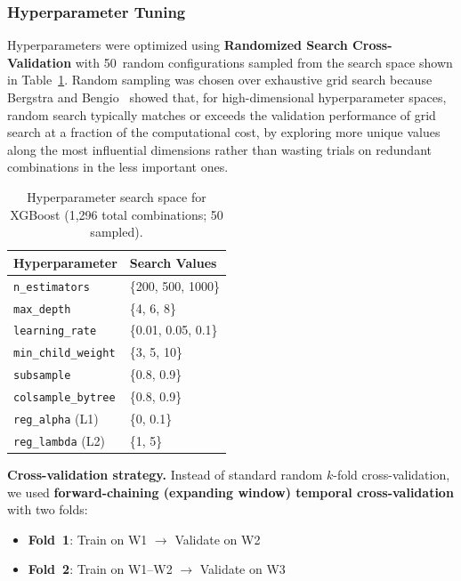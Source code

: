 \subsubsection{Hyperparameter Tuning}
\label{subsubsec:hyperparameter_tuning}

Hyperparameters were optimized using \textbf{Randomized Search Cross-Validation} with 50~random configurations sampled from the search space shown in Table~\ref{tab:hyperparam_search}. Random sampling was chosen over exhaustive grid search because Bergstra and Bengio~\cite{bergstra2012random} showed that, for high-dimensional hyperparameter spaces, random search typically matches or exceeds the validation performance of grid search at a fraction of the computational cost, by exploring more unique values along the most influential dimensions rather than wasting trials on redundant combinations in the less important ones.

\begin{table}[htbp]
\centering
\caption{Hyperparameter search space for XGBoost (1,296 total combinations; 50 sampled).}
\label{tab:hyperparam_search}
\begin{tabular}{ll}
\toprule
\textbf{Hyperparameter} & \textbf{Search Values} \\
\midrule
\texttt{n\_estimators} & \{200, 500, 1000\} \\
\texttt{max\_depth} & \{4, 6, 8\} \\
\texttt{learning\_rate} & \{0.01, 0.05, 0.1\} \\
\texttt{min\_child\_weight} & \{3, 5, 10\} \\
\texttt{subsample} & \{0.8, 0.9\} \\
\texttt{colsample\_bytree} & \{0.8, 0.9\} \\
\texttt{reg\_alpha} (L1) & \{0, 0.1\} \\
\texttt{reg\_lambda} (L2) & \{1, 5\} \\
\bottomrule
\end{tabular}
\end{table}

\textbf{Cross-validation strategy.} Instead of standard random $k$-fold cross-validation, we used \textbf{forward-chaining (expanding window) temporal cross-validation} with two folds:
\begin{itemize}
    \item \textbf{Fold~1}: Train on W1 $\rightarrow$ Validate on W2
    \item \textbf{Fold~2}: Train on W1--W2 $\rightarrow$ Validate on W3
\end{itemize}

